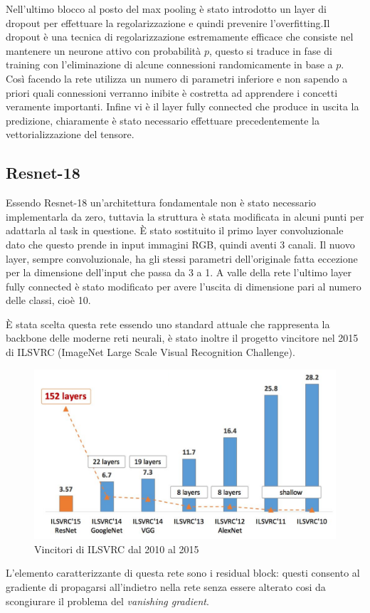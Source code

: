 Nell'ultimo blocco al posto del max pooling è stato introdotto  un layer di dropout \cite{srivastava2014dropout} per effettuare la regolarizzazione e quindi prevenire l'overfitting.Il dropout è una tecnica di regolarizzazione estremamente efficace che consiste nel mantenere un neurone attivo con probabilità $p$, questo si traduce in fase di training con l'eliminazione di alcune connessioni randomicamente in base a $p$. Così facendo la rete utilizza un numero di parametri inferiore e non sapendo a priori quali connessioni verranno inibite è costretta ad apprendere i concetti veramente importanti. Infine vi è il layer fully connected che produce in uscita la predizione, chiaramente è stato necessario effettuare precedentemente la vettorializzazione del tensore.
\subsection*{Resnet-18}
Essendo Resnet-18 un'architettura fondamentale non è stato necessario implementarla da zero, tuttavia la struttura è stata modificata in alcuni punti per adattarla al task in questione. \`{E} stato sostituito il primo layer convoluzionale dato che questo prende in input immagini RGB, quindi aventi 3 canali. Il nuovo layer, sempre convoluzionale, ha gli stessi parametri dell'originale fatta eccezione per la dimensione dell'input che passa da 3 a 1. A valle della rete l'ultimo layer fully connected è stato modificato per avere l'uscita di dimensione pari al numero delle classi, cioè 10.\par
\`{E} stata scelta questa rete essendo uno standard attuale che  rappresenta la backbone delle moderne reti neurali, è stato inoltre il progetto vincitore nel 2015 di ILSVRC \cite{ILSVRC15} (ImageNet Large Scale Visual Recognition Challenge).
\begin{figure}[!hbt]
    \centering
    \includegraphics[width=\columnwidth]{images/ilsvrc_winners.png}
    \caption{Vincitori di ILSVRC dal 2010 al 2015}
    \label{fig6:ILSVRC2015}
\end{figure}\par
L'elemento caratterizzante di questa rete sono i residual block: questi consento al gradiente di propagarsi all'indietro nella rete senza essere alterato cosi da scongiurare il problema del \textit{vanishing gradient}.




  